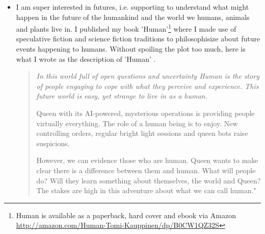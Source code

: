 \documentclass[11pt,letterpaper]{article}
\newenvironment{itquote}
{\begin{quote}\itshape}
{\end{quote}}
\begin{document}
\begin{itemize}
  \item I am super interested in futures, i.e. supporting to understand what might happen in the future of the humankind and the world we humans, animals and plants live in. I published my book 'Human'\footnote{Human is available as a paperback, hard cover and ebook via Amazon \url{http://amazon.com/Human-Tomi-Kauppinen/dp/B0CW1QZ32S}} where I made use of speculative fiction and science fiction traditions to philosophisize about future events happening to humans. Without spoiling the plot too much, here is what I wrote as the description of 'Human' \cite{human-I}.
\begin{itquote}
In this world full of open questions and uncertainty Human is the story of people engaging to cope with what they perceive and experience. This future world is easy, yet strange to live in as a human.

Queen with its AI-powered, mysterious operations is providing people virtually everything. The role of a human being is to enjoy. New controlling orders, regular bright light sessions and queen bots raise suspicions.

However, we can evidence those who are human. Queen wants to make clear there is a difference between them and human. What will people do? Will they learn something about themselves, the world and Queen? The stakes are high in this adventure about what we can call human."


\end{itquote}
\end{itemize}
\end{document}
